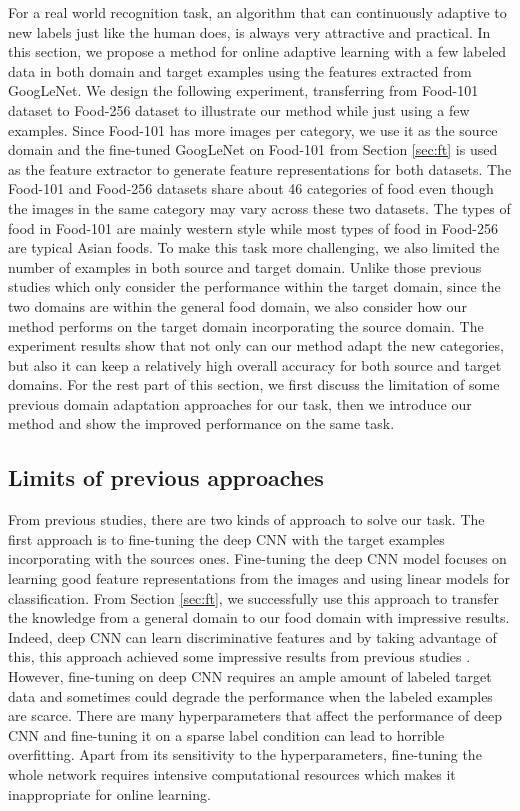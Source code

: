 ﻿For a real world recognition task, an algorithm that can continuously adaptive to new labels just like the human does, is always very attractive and practical.
In this section, we propose a method for online adaptive learning with a few labeled data in both domain and target examples using the features extracted from GoogLeNet. We design the following experiment, transferring from Food-101 dataset to Food-256 dataset to illustrate our method while just using a few examples. Since Food-101 has more images per category, we use it as the source domain and the fine-tuned GoogLeNet on Food-101 from Section \ref{sec:ft} is used as the feature extractor to generate feature representations for both datasets. The Food-101 and Food-256 datasets share about 46 categories of food even though the images in the same category may vary across these two datasets. The types of food in Food-101 are mainly western style while most types of food in Food-256 are typical Asian foods. To make this task more challenging, we also limited the number of examples in both source and target domain. Unlike those previous studies which only consider the performance within the target domain, since the two domains are within the general food domain, we also consider how our method performs on the target domain incorporating the source domain. The experiment results show that not only can our method adapt the new categories, but also it can keep a relatively high overall accuracy for both source and target domains.
For the rest part of this section, we first discuss the limitation of some previous domain adaptation approaches for our task, then we introduce our method and show the improved performance on the same task.
\subsection{Limits of previous approaches}
From previous studies, there are two kinds of approach to solve our task. The first approach is to fine-tuning the deep CNN with the target examples incorporating with the sources ones.
Fine-tuning the deep CNN model focuses on learning good feature representations from the images and using linear models for classification. From Section \ref{sec:ft}, we successfully use this approach to transfer the knowledge from a general domain to our food domain with impressive results. Indeed, deep CNN can learn discriminative features and by taking advantage of this, this approach achieved some impressive results from previous studies\cite{Chatfield14} \cite{zeiler2014visualizing}. However, fine-tuning on deep CNN requires an ample amount of labeled target data and sometimes could degrade the performance when the labeled examples are scarce\cite{hoffman2013one}. There are many hyperparameters that affect the performance of deep CNN and fine-tuning it on a sparse label condition can lead to horrible overfitting. Apart from its sensitivity to the hyperparameters, fine-tuning the whole network requires intensive computational resources which makes it inappropriate for online learning.

